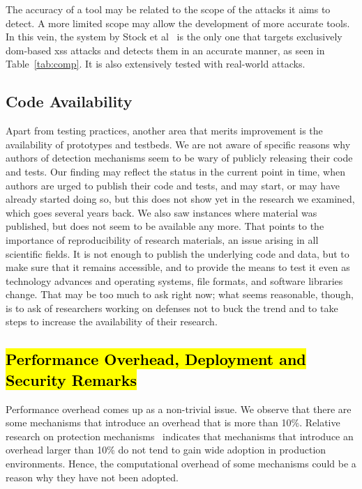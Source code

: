 \documentclass[10pt,journal,compsoc]{IEEEtran}
\newcommand{\hlc}[2][yellow]{ {\sethlcolor{#1} \hl{#2}} }
\begin{document}
The accuracy of a tool may be related to the scope of the attacks it
aims to detect. A more limited scope may allow the development of more
accurate tools. In this vein, the system by Stock et al~\cite{SLMS14}
is the only one that targets exclusively {\sc dom}-based {\sc xss}
attacks and detects them in an accurate manner, as seen in
Table~\ref{tab:comp}. It is also extensively tested with real-world
attacks.

\vspace{-0.3mm}
\subsection{Code Availability}
\vspace{-0.7mm}

Apart from testing practices, another area that merits improvement is
the availability of prototypes and testbeds. We are not aware of
specific reasons why authors of detection mechanisms seem to be
wary of publicly releasing their code and tests. Our finding may reflect
the status in the current point in time, when authors are urged to
publish their code and tests, and may start, or may have already
started doing so, but this does not show yet in the research we
examined, which goes several years back. We also saw instances where
material was published, but does not seem to be available any more.
That points to the importance of reproducibility of research materials, 
an issue arising in all scientific fields. It is not enough to
publish the underlying code and data, but to make sure that it remains
accessible, and to provide the means to test it even as technology
advances and operating systems, file formats, and software libraries
change. That may be too much to ask right now; what seems reasonable,
though, is to ask of researchers working on defenses not to
buck the trend and to take steps to increase the availability of their
research.

\vspace{-0.3mm}
\subsection{\hlc[yellow]{Performance Overhead,
Deployment and Security Remarks}}
\vspace{-0.3mm}

Performance overhead comes up as a non-trivial issue. We observe
that there are some mechanisms that introduce an overhead
that is more than 10\%. Relative
research on protection mechanisms~\cite{SPWS13} indicates that
mechanisms that introduce an overhead larger than 10\% do not tend to
gain wide adoption in production environments. Hence, the
computational overhead of some mechanisms could be a reason why they
have not been adopted.
\end{document}
